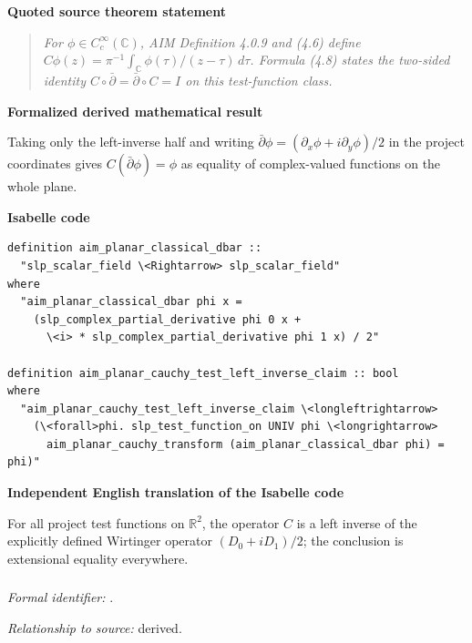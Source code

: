 \documentclass[10pt,oneside]{article}
\newenvironment{sourcequote}{\begin{quote}\itshape}{\end{quote}}
\newcommand{\reviewlabel}[1]{\par\smallskip\noindent\textsf{\bfseries #1}\par\smallskip}
\begin{document}
\reviewlabel{Quoted source theorem statement}
\begin{sourcequote}
For $\phi\in C_c^\infty(\mathbb C)$, AIM Definition 4.0.9 and (4.6) define $C\phi(z)=\pi^{-1}\int_{\mathbb C}\phi(\tau)/(z-\tau)\,d\tau$. Formula (4.8) states the two-sided identity $C\circ\bar\partial=\bar\partial\circ C=I$ on this test-function class.
\end{sourcequote}

\reviewlabel{Formalized derived mathematical result}
Taking only the left-inverse half and writing $\bar\partial\phi=(\partial_x\phi+i\partial_y\phi)/2$ in the project coordinates gives $C(\bar\partial\phi)=\phi$ as equality of complex-valued functions on the whole plane.

\reviewlabel{Isabelle code}
\begin{lstlisting}
definition aim_planar_classical_dbar ::
  "slp_scalar_field \<Rightarrow> slp_scalar_field"
where
  "aim_planar_classical_dbar phi x =
    (slp_complex_partial_derivative phi 0 x +
      \<i> * slp_complex_partial_derivative phi 1 x) / 2"

definition aim_planar_cauchy_test_left_inverse_claim :: bool
where
  "aim_planar_cauchy_test_left_inverse_claim \<longleftrightarrow>
    (\<forall>phi. slp_test_function_on UNIV phi \<longrightarrow>
      aim_planar_cauchy_transform (aim_planar_classical_dbar phi) = phi)"
\end{lstlisting}

\reviewlabel{Independent English translation of the Isabelle code}
For all project test functions on $\mathbb R^2$, the operator $C$ is a left inverse of the explicitly defined Wirtinger operator $(D_0+iD_1)/2$; the conclusion is extensional equality everywhere.

\subsubsection{\texttt{}}
\noindent\textit{Formal identifier:} \texttt{}.\par
\noindent\textit{Relationship to source:} derived.
\end{document}
